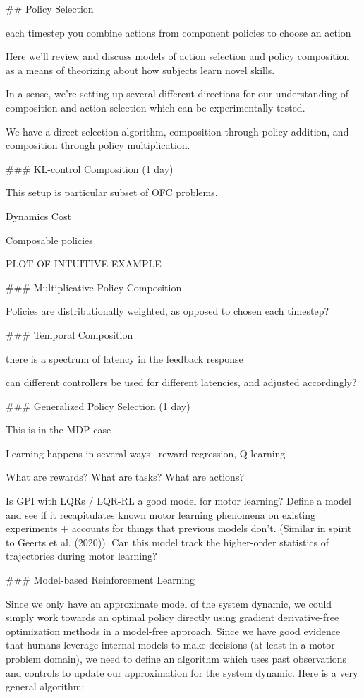 ## Policy Selection

each timestep you combine actions from component policies to choose an action

Here we'll review and discuss models of action selection and policy composition as a means of theorizing about how subjects learn novel skills. 

In a sense, we're setting up several different directions for our understanding of composition and action selection which can be experimentally tested. 

We have a direct selection algorithm, composition through policy addition, and composition through policy multiplication. 


### KL-control Composition (1 day)

This setup is particular subset of OFC problems. 

Dynamics
Cost

Composable policies

PLOT OF INTUITIVE EXAMPLE

### Multiplicative Policy Composition

Policies are distributionally weighted, as opposed to chosen each timestep? 

### Temporal Composition

there is a spectrum of latency in the feedback response

can different controllers be used for different latencies, and adjusted accordingly?

### Generalized Policy Selection (1 day)

This is in the MDP case

Learning happens in several ways-- reward regression, Q-learning

What are rewards? 
What are tasks?
What are actions?

Is GPI with LQRs / LQR-RL a good model for motor learning? Define a model and see if it recapitulates known motor learning phenomena on existing experiments + accounts for things that previous models don’t. (Similar in spirit to Geerts et al. (2020)). Can this model track the higher-order statistics of trajectories during motor learning?

### Model-based Reinforcement Learning

Since we only have an approximate model of the system dynamic, we could simply work towards an optimal policy directly using gradient derivative-free optimization methods in a model-free approach. Since we have good evidence that humans leverage internal models to make decisions (at least in a motor problem domain), we need to define an algorithm which uses past observations and controls to update our approximation for the system dynamic. Here is a very general algorithm:

